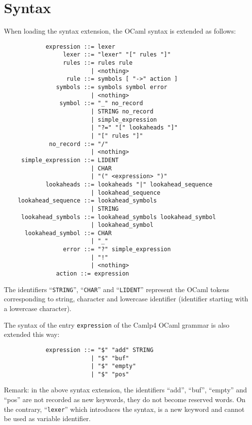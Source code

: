 \documentclass[11pt]{article}
\begin{document}
\section{Syntax}
\label{syntax}

When loading the syntax extension, the OCaml syntax is extended as
follows:

\begin{verbatim}
            expression ::= lexer
                 lexer ::= "lexer" "[" rules "]"
                 rules ::= rules rule
                         | <nothing>
                  rule ::= symbols [ "->" action ]
               symbols ::= symbols symbol error
                         | <nothing>
                symbol ::= "_" no_record
                         | STRING no_record
                         | simple_expression
                         | "?=" "[" lookaheads "]"
                         | "[" rules "]"
             no_record ::= "/"
                         | <nothing>
     simple_expression ::= LIDENT
                         | CHAR
                         | "(" <expression> ")"
            lookaheads ::= lookaheads "|" lookahead_sequence
                         | lookahead_sequence
    lookahead_sequence ::= lookahead_symbols
                         | STRING
     lookahead_symbols ::= lookahead_symbols lookahead_symbol
                         | lookahead_symbol
      lookahead_symbol ::= CHAR
                         | "_"
                 error ::= "?" simple_expression
                         | "!"
                         | <nothing>
               action ::= expression
\end{verbatim}

The identifiers ``\verb/STRING/'', ``\verb/CHAR/'' and
``\verb/LIDENT/'' represent the OCaml tokens corresponding to string,
character and lowercase identifier (identifier starting with a
lowercase character).

The syntax of the entry \verb/expression/ of the Camlp4 OCaml grammar
is also extended this way:

\begin{verbatim}
            expression ::= "$" "add" STRING
                         | "$" "buf"
                         | "$" "empty"
                         | "$" "pos"
\end{verbatim}

Remark: in the above syntax extension, the identifiers ``add'',
``buf'', ``empty'' and ``pos'' are not recorded as new keywords, they
do not become reserved words. On the contrary, ``\verb/lexer/'' which
introduces the syntax, is a new keyword and cannot be used as
variable identifier.
\end{document}
